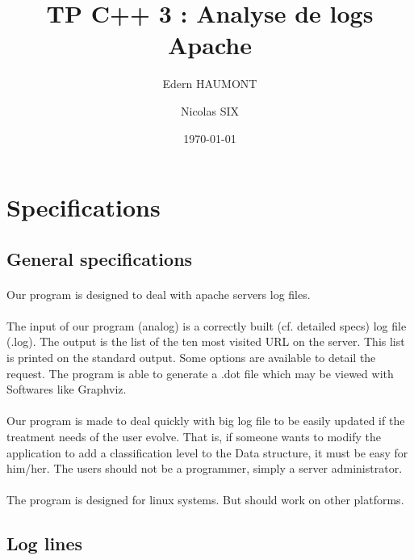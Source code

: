 \documentclass[a4paper, 12pts]{article}
\title{TP C++ 3 : Analyse de logs Apache}
\author{Edern HAUMONT}
\author{Nicolas SIX}
\affil{B3111}
\date{\today}
\begin{document}

\maketitle



\section{Specifications}
\subsection{General specifications}
\paragraph{}
Our program is designed to deal with apache servers log files.
\paragraph{}
The input of our program (analog) is a correctly built (cf. detailed specs) log file (.log). The output is the list of the ten most visited URL on the server. This list is printed on the standard output. Some options are available to detail the request. The program is able to generate a .dot file which may be viewed with Softwares like Graphviz.
\paragraph{}
 Our program is made to deal quickly with big log file to be easily updated if the treatment needs of the user evolve. That is, if someone wants to modify the application to add a classification level to the Data structure, it must be easy for him/her. The users should not be a programmer, simply a server administrator.
\paragraph{}
 The program is designed for linux systems. But should work on other platforms.

\subsection{Log lines}
\end{document}

